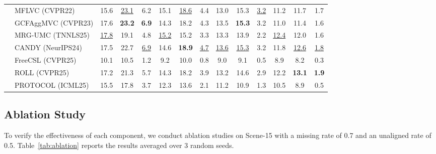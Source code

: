 \documentclass{article}
\theoremstyle{plain}
\theoremstyle{definition}
\theoremstyle{remark}
\begin{document}
\begin{table}[t]
\begin{center}
\begin{footnotesize}
\begin{sc}
\begin{tabular}{llcccccccccccc}
 & MFLVC (CVPR22) & 15.6 & \underline{23.1} & 6.2 & 15.1 & \underline{18.6} & 4.4 & 13.0 & 15.3 & \underline{3.2} & 11.2 & 11.7 & 1.7 \\
 & GCFAggMVC (CVPR23) & 17.6 & \textbf{23.2} & \textbf{6.9} & 14.3 & 18.2 & 4.3 & 13.5 & \textbf{15.3} & 3.2 & 11.0 & 11.4 & 1.6 \\
 & MRG-UMC (TNNLS25) & \underline{17.8} & 19.1 & 4.8 & \underline{15.2} & 15.2 & 3.3 & 13.3 & 13.9 & 2.2 & \underline{12.4} & 12.0 & 1.6 \\
 & CANDY (NeurIPS24) & 17.5 & 22.7 & \underline{6.9} & 14.6 & \textbf{18.9} & \underline{4.7} & \underline{13.6} & \underline{15.3} & 3.2 & 11.8 & \underline{12.6} & \underline{1.8} \\
 & FreeCSL (CVPR25) & 10.1 & 10.5 & 1.2 & 9.2 & 10.0 & 0.8 & 9.0 & 9.1 & 0.5 & 8.9 & 8.2 & 0.3 \\
 & ROLL (CVPR25) & 17.2 & 21.3 & 5.7 & 14.3 & 18.2 & 3.9 & 13.2 & 14.6 & 2.9 & 12.2 & \textbf{13.1} & \textbf{1.9} \\
 & PROTOCOL (ICML25) & 15.5 & 17.8 & 3.7 & 12.3 & 13.6 & 2.1 & 11.2 & 10.9 & 1.3 & 10.5 & 8.9 & 0.5 \\
\bottomrule
\end{tabular}
\end{sc}
\end{footnotesize}
\end{center}
\vskip -0.1in
\end{table}






\subsection{Ablation Study}
\label{subsec:ablation}

To verify the effectiveness of each component, we conduct ablation studies on Scene-15 with a missing rate of 0.7 and an unaligned rate of 0.5. Table~\ref{tab:ablation} reports the results averaged over 3 random seeds.
\end{document}
